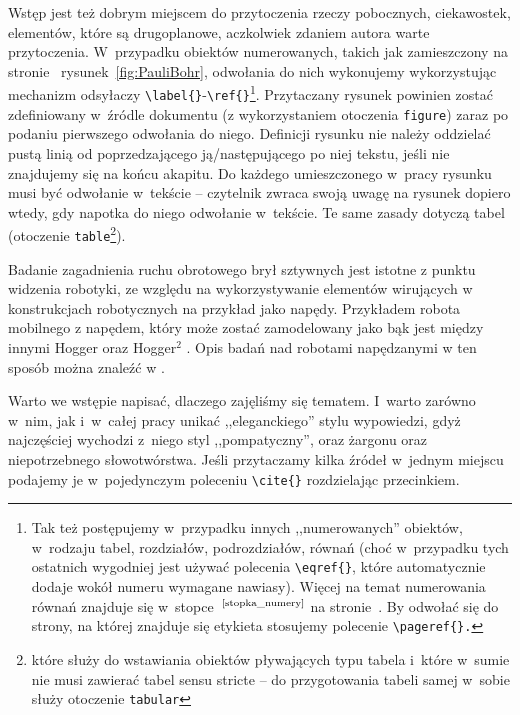 {\red
  Wstęp jest też dobrym miejscem do przytoczenia rzeczy pobocznych, ciekawostek, elementów, które są drugoplanowe, aczkolwiek zdaniem autora warte przytoczenia. W~przypadku obiektów numerowanych, takich jak zamieszczony na stronie~\pageref{fig:PauliBohr} rysunek~\ref{fig:PauliBohr},\label{odsylacze} odwołania do nich wykonujemy wykorzystując mechanizm odsyłaczy \texttt{\textbackslash label\{\}}-\texttt{\textbackslash ref\{\}}\footnote{\red Tak też postępujemy w~przypadku innych ,,numerowanych'' obiektów, w~rodzaju tabel, rozdziałów, podrozdziałów, równań (choć w~przypadku tych ostatnich wygodniej jest używać polecenia \texttt{\textbackslash eqref\{\}}, które automatycznie dodaje wokół numeru wymagane nawiasy). Więcej na temat numerowania równań znajduje się w~stopce~$^\text{\ref{stopka_numery}}$ na stronie~\pageref{stopka_numery}. By odwołać się do strony, na której znajduje się etykieta stosujemy polecenie \texttt{\textbackslash pageref\{\}.}}. Przytaczany rysunek powinien zostać zdefiniowany w~źródle dokumentu (z wykorzystaniem otoczenia \texttt{figure}) zaraz po podaniu pierwszego odwołania do niego. Definicji rysunku nie należy oddzielać pustą linią od poprzedzającego ją/następującego po niej tekstu, jeśli nie znajdujemy się na końcu akapitu. Do każdego umieszczonego w~pracy rysunku musi być odwołanie w~tekście -- czytelnik zwraca swoją uwagę na rysunek dopiero wtedy, gdy napotka do niego odwołanie w~tekście. Te same zasady dotyczą tabel (otoczenie \texttt{table}\footnote{\red które służy do wstawiania obiektów pływających typu tabela i~które w~sumie nie musi zawierać tabel sensu stricte -- do przygotowania tabeli samej w~sobie służy otoczenie \texttt{tabular}}).}

Badanie zagadnienia ruchu obrotowego brył sztywnych jest istotne z punktu widzenia robotyki, ze względu na wykorzystywanie elementów wirujących w konstrukcjach robotycznych na przykład jako napędy. Przykładem robota mobilnego z napędem, który może zostać zamodelowany jako bąk jest między innymi Hogger \cite{ryba} oraz Hogger$^2$ \cite{goral}. Opis badań nad robotami napędzanymi w ten sposób można znaleźć w \cite{JonMu,JonMu2}.

{\red
  Warto we wstępie napisać, dlaczego zajęliśmy się tematem. I~warto zarówno w~nim, jak i~w~całej pracy unikać ,,eleganckiego'' stylu wypowiedzi, gdyż najczęściej wychodzi z~niego styl ,,pompatyczny'', oraz żargonu oraz niepotrzebnego słowotwórstwa. Jeśli przytaczamy kilka źródeł w~jednym miejscu podajemy je w~pojedynczym poleceniu \texttt{\textbackslash cite\{\}} rozdzielając przecinkiem.}

